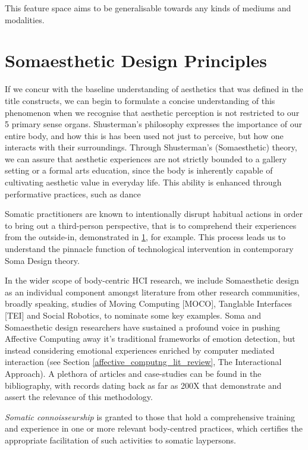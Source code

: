 This feature space aims to be generalisable towards any kinds of mediums and modalities. 

\section{Somaesthetic Design Principles}

If we concur with the baseline understanding of aesthetics that was defined in the title constructs, we can begin to formulate a concise understanding of this phenomenon when we recognise that aesthetic perception is not restricted to our 5 primary sense organs. Shusterman's philosophy expresses the importance of our entire body, and how this is has been used not just to perceive, but how one interacts with their surroundings. Through Shusterman’s (Somaesthetic) theory, we can assure that aesthetic experiences are not strictly bounded to a gallery setting or a formal arts education, since the body is inherently capable of cultivating aesthetic value in everyday life. This ability is enhanced through performative practices, such as dance \cite{eric_c_mullis_performative_2006}

Somatic practitioners are known to intentionally disrupt habitual actions in order to bring out a third-person perspective, that is to comprehend their experiences from the outside-in, demonstrated in \ref{}, for example. This process leads us to understand the pinnacle function of technological intervention in contemporary Soma Design theory.

In the wider scope of body-centric HCI research, we include Somaesthetic design as an individual component amongst literature from other research communities, broadly speaking, studies of Moving Computing [MOCO], Tanglable Interfaces [TEI] and Social Robotics, to nominate some key examples. Soma and Somaesthetic design researchers have sustained a profound voice in pushing Affective Computing away it's traditional frameworks of emotion detection, but instead considering emotional experiences enriched by computer mediated interaction (see Section \ref{affective_computng_lit_review}, The Interactional Approach). A plethora of articles and case-studies can be found in the bibliography, with records dating back as far as 200X that demonstrate and assert the relevance of this methodology.

\textit{Somatic connoisseurship} is granted to those that hold a comprehensive training and experience in one or more relevant body-centred practices, which certifies the appropriate facilitation of such activities to somatic laypersons. 

